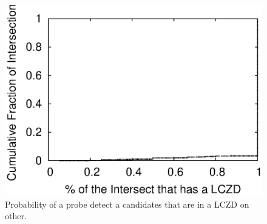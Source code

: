

\begin{figure}
\begin{center}
\includegraphics[width=0.8\columnwidth]{figs/patching/overlapcoverage/overlapcoverage_only_lczd.eps}
\caption{Probability of a probe detect a candidates that are in a LCZD on other.}
\label{fig:lczd.intersection}
\end{center}
%
\end{figure}
